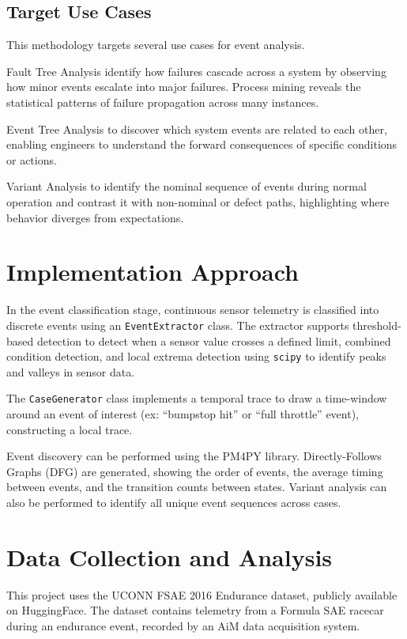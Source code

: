 \documentclass[14pt]{extarticle}
\begin{document}
\subsection{Target Use Cases}

This methodology targets several use cases for event analysis.

Fault Tree Analysis identify how failures cascade across a system by observing how minor events escalate into major failures. Process mining reveals the statistical patterns of failure propagation across many instances.

Event Tree Analysis to discover which system events are related to each other, enabling engineers to understand the forward consequences of specific conditions or actions.

Variant Analysis to identify the nominal sequence of events during normal operation and contrast it with non-nominal or defect paths, highlighting where behavior diverges from expectations.

\section{Implementation Approach}

In the event classification stage, continuous sensor telemetry is classified into discrete events using an \texttt{EventExtractor} class. The extractor supports threshold-based detection to detect when a sensor value crosses a defined limit, combined condition detection, and local extrema detection using \texttt{scipy} to identify peaks and valleys in sensor data.

The \texttt{CaseGenerator} class implements a temporal trace to draw a time-window around an event of interest (ex: ``bumpstop hit'' or ``full throttle'' event), constructing a local trace.

Event discovery can be performed using the PM4PY library. Directly-Follows Graphs (DFG) are generated, showing the order of events, the average timing between events, and the transition counts between states. Variant analysis can also be performed to identify all unique event sequences across cases.

\section{Data Collection and Analysis}

This project uses the UCONN FSAE 2016 Endurance dataset, publicly available on HuggingFace. The dataset contains telemetry from a Formula SAE racecar during an endurance event, recorded by an AiM data acquisition system.
\end{document}
